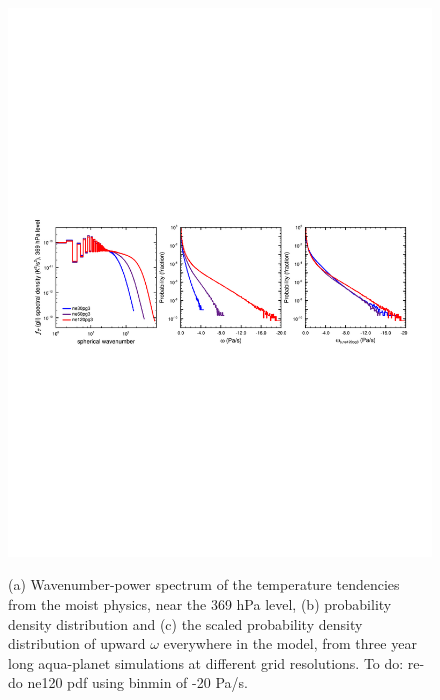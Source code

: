 \documentclass{agujournal}
\begin{document}
\begin{figure}[t]
\begin{center}
\noindent\includegraphics[width=30pc,angle=0]{figs/pg3panel.pdf}\\
\end{center}
\caption{(a) Wavenumber-power spectrum of the temperature tendencies from the moist physics, near the 369 hPa level, (b) probability density distribution and (c) the scaled probability density distribution of upward $\omega$ everywhere in the model, from three year long aqua-planet simulations at different grid resolutions. {\color{red}To do: re-do ne120 pdf using binmin of -20 Pa/s.}}
\label{fig:pg3panel}
\end{figure}
\end{document}
